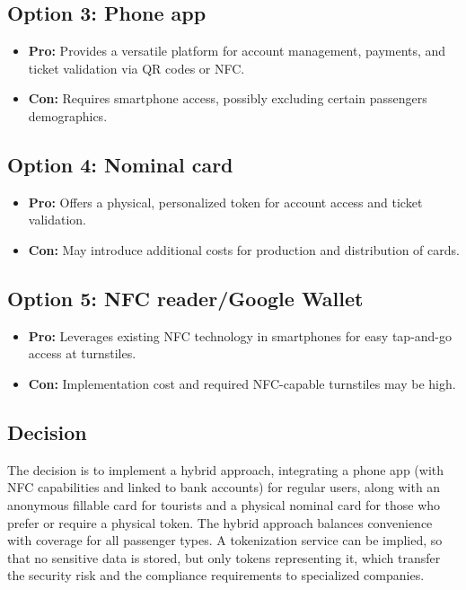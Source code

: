 \subsection*{Option 3: Phone app}
\begin{itemize}
    \item \textbf{Pro:} Provides a versatile platform for account management, payments, and ticket validation via QR codes or NFC.
    \item \textbf{Con:} Requires smartphone access, possibly excluding certain passengers demographics.
\end{itemize}

\subsection*{Option 4: Nominal card}
\begin{itemize}
    \item \textbf{Pro:} Offers a physical, personalized token for account access and ticket validation.
    \item \textbf{Con:} May introduce additional costs for production and distribution of cards.
\end{itemize}

\subsection*{Option 5: NFC reader/Google Wallet}
\begin{itemize}
    \item \textbf{Pro:} Leverages existing NFC technology in smartphones for easy tap-and-go access at turnstiles.
    \item \textbf{Con:} Implementation cost and required NFC-capable turnstiles may be high.
\end{itemize}

\subsection*{Decision}
The decision is to implement a hybrid approach, integrating a phone app (with NFC capabilities and linked to bank accounts) for regular users, along with an anonymous fillable card for tourists and a physical nominal card for those who prefer or require a physical token. The hybrid approach balances convenience with coverage for all passenger types.
A tokenization service can be implied, so that no sensitive data is stored, but only tokens representing it, which transfer the security risk and the compliance requirements to specialized companies.

